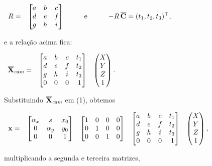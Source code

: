\begin{center}
$
\begin{array}{cccc}
R=
&
\begin{bmatrix}
a&b&c\\
d&e&f\\
g&h&i
\end{bmatrix}
&
\qquad\text{e}\qquad
&
-R\,\overline{\bf C}=(t_1,t_2,t_3)^\top,
\end{array}
$
\end{center}
e a relação acima fica:

\begin{center}
$
\begin{array}{ccc}
\overline{\mathbf{X}}_{\textit{cam}}=
&
\begin{bmatrix}
a&b&c&t_1\\
d&e&f&t_2\\
g&h&i&t_3\\
0&0&0&\,1
\end{bmatrix}
&
\begin{pmatrix}
X\\
Y\\
Z\\
1
\end{pmatrix}.
\end{array}
$
\end{center}

Substituindo $\overline{\mathbf{X}}_{\textit{cam}}$ em (1), obtemos

\begin{center}
$
\begin{array}{ccccc}
\mathbf{x}=
&
\begin{bmatrix}
\alpha_x&s&x_0\\
0&\alpha_y&y_0\\
0&0&1
\end{bmatrix}&
\begin{bmatrix}
1&0&0&0\\
0&1&0&0\\
0&0&1&0
\end{bmatrix}
&
\begin{bmatrix}
a&b&c&t_1\\
d&e&f&t_2\\
g&h&i&t_3\\
0&0&0&\,1
\end{bmatrix}
&
\begin{pmatrix}
X\\
Y\\
Z\\
1
\end{pmatrix},
\end{array}
$
\end{center}
multiplicando a segunda e terceira matrizes,
 
